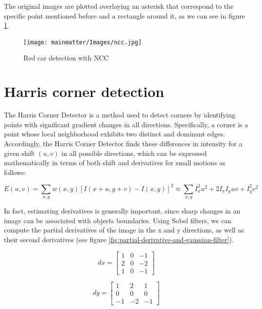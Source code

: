 The original images are plotted overlaying an asterisk that correspond to the specific point mentioned before and a rectangle around it, as we can see in figure \ref{fig:ncc}.

\begin{figure}[h]
    \centering
    \texttt{[image: mainmatter/Images/ncc.jpg]}
    \caption{Red car detection with NCC}
    \label{fig:ncc}
\end{figure}
\vfill

\chapter{Harris corner detection}
The Harris Corner Detector is a method used to detect corners by identifying points with significant gradient 
changes in all directions. Specifically, a corner is a point whose local neighborhood exhibits two distinct and dominant edges. Accordingly, the Harris Corner Detector finds these differences in intensity for a given shift $(u, v)$ in all possible directions, which can be expressed mathematically in terms of both shift and derivatives for small motions as follows:

\begin{equation}
	E(u, v) = \sum_{x, y} w(x, y) [I(x+u, y+v)-I(x, y)]^2 \approx \sum_{x, y} I_x^2 u^2 + 2I_x I_y uv + I_y^2 v^2
\end{equation}

In fact, estimating derivatives is generally important, since sharp changes in an image can be associated with objects boundaries. Using Sobel filters, we can compute the partial derivatives of the image in the x and y directions, as well as their second derivatives (see figure \ref{fig:partial-derivative-and-gaussian-filter}).

\begin{minipage}{0.45\textwidth}
	\centering
	\begin{equation}
		dx = \begin{bmatrix}
			1 & 0 & -1 \\
			2 & 0 & -2 \\
			1 & 0 & -1
		\end{bmatrix}
		\label{eq:dx}
	\end{equation}
\end{minipage}
\hfill 
\begin{minipage}{0.45\textwidth}
	\centering
	\begin{equation}
		dy = \begin{bmatrix}
			1 & 2 & 1 \\
			0 & 0 & 0 \\
			-1 & -2 & -1
		\end{bmatrix}
		\label{eq:dy}
	\end{equation}
\end{minipage}

